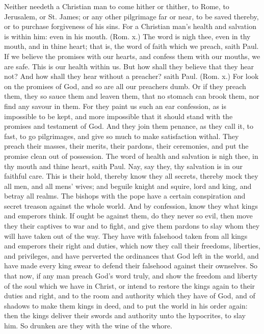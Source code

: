 Neither needeth a Christian man to come hither or 
thither, to Rome, to Jerusalem, or St. James; or any 
other pilgrimage far or near, to be saved thereby, or to 
purchase forgiveness of his sins. For a Christian man's 
health and salvation is within him: even in his mouth. 
(Rom. x.) The word is nigh thee, even in thy mouth, 
and in thine heart; that is, the word of faith which we 
preach, saith Paul. If we believe the promises with our 
hearts, and confess them with our mouths, we are safe. 
This is our health within us. But how shall they believe 
that they hear not? And how shall they hear without a 
preacher? saith Paul. (Rom. x.) For look on the promises
of God, and so are all our preachers dumb. Or 
if they preach them, they so sauce them and leaven them, 
that no stomach can brook them, nor find any savour in 
them. For they paint us such an ear confession, as is 
impossible to be kept, and more impossible that it should 
stand with the promises and testament of God. And 
they join them penance, as they call it, to fast, to go 
pilgrimages, and give so much to make satisfaction withal. 
They preach their masses, their merits, their pardons, 
their ceremonies, and put the promise clean out of possession.
The word of health and salvation is nigh thee, 
in thy mouth and thine heart, saith Paul. Nay, say they, 
thy salvation is in our faithful care. This is their 
hold, thereby know they all secrets, thereby mock 
they all men, and all mens' wives; and beguile knight 
and squire, lord and king, and betray all realms. The 
bishops with the pope have a certain conspiration and 
secret treason against the whole world. And by confession,
know they what kings and emperors think. If 
ought be against them, do they never so evil, then move 
they their captives to war and to fight, and give them 
pardons to slay whom they will have taken out of the way. 
They have with falsehood taken from all kings and emperors 
their right and duties, which now they call their freedoms, 
liberties, and privileges, and have perverted the ordinances 
that God left in the world, and have made every king swear 
to defend their falsehood against their ownselves. So that 
now, if any man preach God's word truly, and show 
the freedom and liberty of the soul which we have 
in Christ, or intend to restore the kings again to their 
duties and right, and to the room and authority which 
they have of God, and of shadows to make them kings 
in deed, and to put the world in his order again: then the 
kings deliver their swords and authority unto the hypocrites, 
to slay him. So drunken are they with the wine of 
the whore. 

